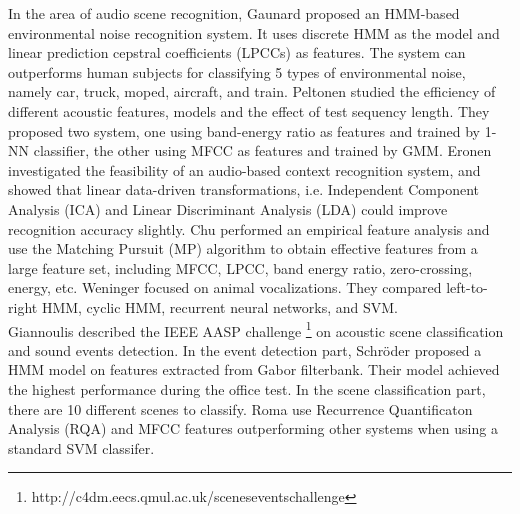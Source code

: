 In the area of audio scene recognition, Gaunard \cite{gaunard1998automatic} proposed an HMM-based environmental noise recognition system. 
It uses discrete HMM as the model and linear prediction cepstral coefficients (LPCCs) as features. 
The system can outperforms human subjects for classifying 5 types of environmental noise, namely car, truck, moped, aircraft, and train. 
Peltonen \cite{peltonen2001computational} studied the efficiency of different acoustic features, models and the effect of test sequency length. 
They proposed two system, one using band-energy ratio as features and trained by 1-NN classifier, the other using MFCC as features and trained by GMM. 
Eronen  \cite{eronen2006audio-based} investigated the feasibility of an audio-based context recognition system, and showed that linear data-driven transformations, i.e. Independent   Component Analysis (ICA) and Linear Discriminant Analysis (LDA) could improve recognition accuracy slightly. 
Chu \cite{chu2009environmental} performed an empirical feature analysis and use the Matching Pursuit (MP) algorithm to obtain effective features from a large feature set, including MFCC, LPCC, band energy ratio, zero-crossing, energy, etc. 
Weninger \cite{weninger2011audio} focused on animal vocalizations. They compared left-to-right HMM, cyclic HMM, recurrent neural networks, and SVM. \\

Giannoulis \cite{giannoulis2013applications} described the IEEE AASP challenge \footnote{http://c4dm.eecs.qmul.ac.uk/sceneseventschallenge} on acoustic scene classification and sound events detection.  
In the event detection part, Schr\"{o}der \cite{schroder2013acoustic} proposed a HMM model on features extracted from Gabor filterbank. 
Their model achieved the highest performance during the office test.   
In the scene classification part, there are 10 different scenes to classify. 
Roma \cite{romarecurrence} use Recurrence Quantificaton Analysis (RQA) and MFCC features outperforming other systems when using a standard SVM classifer. 


